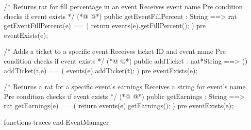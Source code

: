 \begin{vdmpp}[breaklines=true]
 /*
  Returns rat for fill percentage in an event
  Receives event name
  Pre condition checks if event exists
 */
(*@
\label{getEventFillPercent:96}
@*)
 public getEventFillPercent : String ==> rat
 getEventFillPercent(e) == (
  return events(e).getFillPercent();
 )
 pre eventExists(e);
 
 /*
  Adds a ticket to a specific event
  Receives ticket ID and event name
  Pre condition checks if event exists
 */
(*@
\label{addTicket:107}
@*)
 public addTicket : nat*String ==> ()
 addTicket(t,e) == (
  events(e).addTicket(t);
 )
 pre eventExists(e);
 
 /*
  Returns a rat for a specific event's earnings
  Receives a string for event's name
  Pre condition checks if event exists
 */
(*@
\label{getEarnings:118}
@*)
 public getEarnings : String ==> rat
 getEarnings(e) == (
  return events(e).getEarnings();
 )
 pre eventExists(e);
 

functions
traces
end EventManager
\end{vdmpp}
